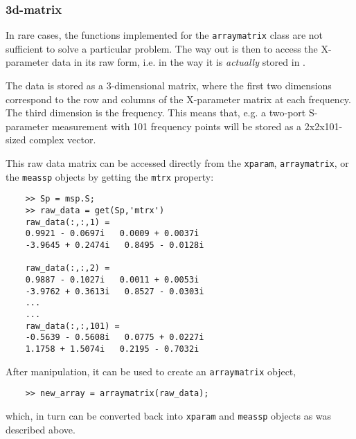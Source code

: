 \subsubsection{3d-matrix}
In rare cases, the functions implemented for the
\verb"arraymatrix" class are not sufficient to solve a particular
problem. The way out is then to access the X-parameter data in its
raw form, i.e. in the way it is \emph{actually} stored in \matlab.

The data is stored as a 3-dimensional matrix, where the first two
dimensions correspond to the row and columns of the X-parameter
matrix at each frequency. The third dimension is the frequency.
This means that, e.g. a two-port S-parameter measurement with 101
frequency points will be stored as a 2x2x101-sized complex vector.

This raw data matrix can be accessed directly from the
\verb"xparam", \verb"arraymatrix", or the \verb"meassp" objects by
getting the \verb"mtrx" property:
\begin{small}
\begin{verbatim}
    >> Sp = msp.S;
    >> raw_data = get(Sp,'mtrx')
    raw_data(:,:,1) =
    0.9921 - 0.0697i   0.0009 + 0.0037i
    -3.9645 + 0.2474i   0.8495 - 0.0128i

    raw_data(:,:,2) =
    0.9887 - 0.1027i   0.0011 + 0.0053i
    -3.9762 + 0.3613i   0.8527 - 0.0303i
    ...
    ...
    raw_data(:,:,101) =
    -0.5639 - 0.5608i   0.0775 + 0.0227i
    1.1758 + 1.5074i   0.2195 - 0.7032i
\end{verbatim}
\end{small}
After manipulation, it can be used to create an \verb"arraymatrix"
object,
\begin{small}
\begin{verbatim}
    >> new_array = arraymatrix(raw_data);
\end{verbatim}
\end{small}
which, in turn can be converted back into \verb"xparam" and
\verb"meassp" objects as was described above.
